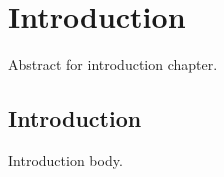 \chapter{Introduction}
\label{chap:intro}

Abstract for introduction chapter.

\section{Introduction}

Introduction body.
